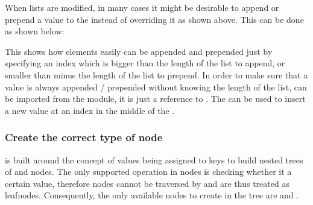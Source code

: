 \documentclass[a4paper,10pt,english]{sphinxmanual}
\begin{document}
\sphinxAtStartPar
When lists are modified, in many cases it might be desirable to append or prepend a value to the  instead of overriding it as shown above. This can be done as shown below:

\begin{sphinxVerbatim}[commandchars=\\\{\},numbers=left,firstnumber=1,stepnumber=1]
    
   
\end{sphinxVerbatim}

\sphinxAtStartPar
This shows how elements easily can be appended and prepended just by specifying an index which is bigger than the length of the list to append, or smaller than minus the length of the list to prepend. In order to make sure that a value is always appended / prepended without knowing the length of the list,  can be imported from the \sphinxhyphen{}module, it is just a reference to . The  {\hyperref[\detokenize{README:list-insert}]{}} can be used to insert a new value at an index in the middle of the .


\subsubsection{Create the correct type of node}
\label{\detokenize{README:create-the-correct-type-of-node}}
\sphinxAtStartPar
{} is built around the concept of values being assigned to keys to build nested trees of \sphinxhyphen{} and \sphinxhyphen{}nodes. The only supported operation in \sphinxhyphen{}nodes is checking whether it  a certain value, therefore \sphinxhyphen{}nodes cannot be traversed by {\hyperref[\detokenize{README:the-path-parameter}]{}} and are thus treated as leaf\sphinxhyphen{}nodes. Consequently, the only available nodes to create in the tree are   and  .
\end{document}
